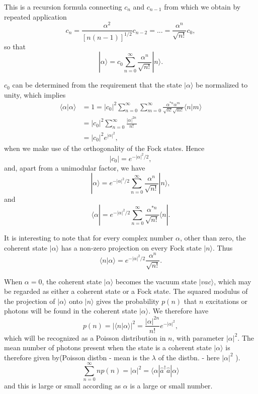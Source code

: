 This is a recursion formula connecting $c_{n}$ and $c_{n-1}$ from which we obtain by repeated application
\begin{equation*} c_{n}=\frac{\alpha^{2}}{[n(n-1)]^{1/2}}c_{n-2}=...=\frac{\alpha^{n}}{\sqrt{n!}}c_{0}, \end{equation*}
so that
\begin{equation*} |\alpha\rangle=c_{0}\sum_{n=0}^{\infty}\frac{\alpha^{n}}{\sqrt{n!}}|n\rangle. \end{equation*}

$c_{0}$ can be determined from the requirement that the state $|\alpha\rangle$ be normalized to unity, which implies
\begin{align*}
\langle\alpha|\alpha\rangle &= 1=|c_{0}|^{2}\sum_{n=0}^{\infty}\sum_{m=0}^{\infty}\frac{\alpha^{*n}\alpha^{m}}{\sqrt{n!}\sqrt{m!}}\langle n|m\rangle \\
&= |c_{0}|^{2}\sum_{n=0}^{\infty}\frac{|\alpha|^{2n}}{n!} \\
&= |c_{0}|^{2}e^{|\alpha|^{2}},
\end{align*}
when we make use of the orthogonality of the Fock states. Hence
\begin{equation*} |c_{0}|=e^{-|\alpha|^{2}/2}, \end{equation*}
and, apart from a unimodular factor, we have
\begin{equation}
    |\alpha\rangle=e^{-|\alpha|^{2}/2}\sum_{n=0}^{\infty}\frac{\alpha^{n}}{\sqrt{n!}}|n\rangle, 
\end{equation}
and
\begin{equation*} \langle\alpha|=e^{-|\alpha|^{2}/2}\sum_{n=0}^{\infty}\frac{\alpha^{*n}}{\sqrt{n!}}\langle n|. \end{equation*}

It is interesting to note that for every complex number $\alpha$, other than zero, the coherent state $|\alpha\rangle$ has a non-zero projection on every Fock state $|n\rangle$. Thus
\begin{equation*} \langle n|\alpha\rangle=e^{-|\alpha|^{2}/2}\frac{\alpha^{n}}{\sqrt{n!}}. \end{equation*}

When $\alpha=0$, the coherent state $|\alpha\rangle$ becomes the vacuum state $|vac\rangle$, which may be regarded as either a coherent state or a Fock state. The squared modulus of the projection of $|\alpha\rangle$ onto $|n\rangle$ gives the probability $p(n)$ that $n$ excitations or photons will be found in the coherent state $|\alpha\rangle$. We therefore have
\begin{equation} p(n)=|\langle n|\alpha\rangle|^{2}=\frac{|\alpha|^{2n}}{n!}e^{-|\alpha|^{2}}, \end{equation}
which will be recognized as a Poisson distribution in $n$, with parameter $|\alpha|^{2}$. The mean number of photons present when the state is a coherent state $|\alpha\rangle$ is therefore given by(Poisson distbn - mean is the $\lambda$ of the distbn. - here  $|\alpha|^{2}$ ).
\begin{equation}
\sum_{n=0}^{\infty}np(n)=|\alpha|^{2}=\langle\alpha|\hat{a}^{\dagger}\hat{a}|\alpha\rangle 
\end{equation}
and this is large or small according as $\alpha$ is a large or small number.

